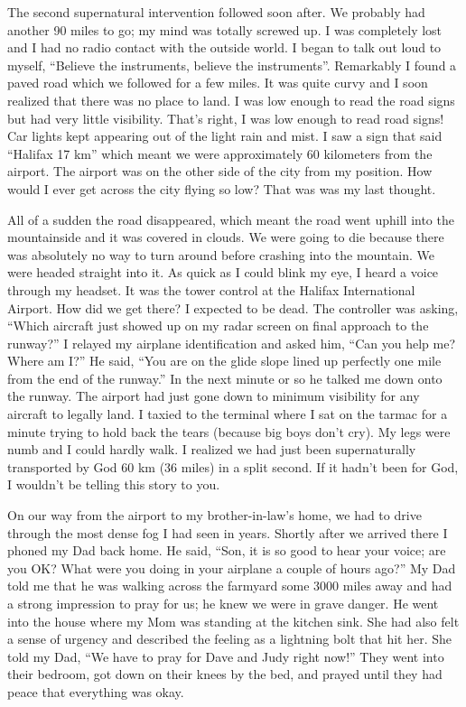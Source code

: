 \documentclass[oneside]{book}
\begin{document}
The second supernatural intervention followed soon after. We probably had another 90 miles to go; my mind was totally screwed up. I was completely lost and I had no radio contact with the outside world. I began to talk out loud to myself, “Believe the instruments, believe the instruments”. Remarkably I found a paved road which we followed for a few miles. It was quite curvy and I soon realized that there was no place to land. I was low enough to read the road signs but had very little visibility. That’s right, I was low enough to read road signs! Car lights kept appearing out of the light rain and mist. I saw a sign that said “Halifax 17 km” which meant we were approximately 60 kilometers from the airport. The airport was on the other side of the city from my position. How would I ever get across the city flying so low? That was was my last thought. 

All of a sudden the road disappeared, which meant the road went uphill into the mountainside and it was covered in clouds. We were going to die because there was absolutely no way to turn around before crashing into the mountain. We were headed straight into it. As quick as I could blink my eye, I heard a voice through my headset. It was the tower control at the Halifax International Airport. How did we get there? I expected to be dead. The controller was asking, “Which aircraft just showed up on my radar screen on final approach to the runway?” I relayed my airplane identification and asked him, “Can you help me? Where am I?” He said, “You are on the glide slope lined up perfectly one mile from the end of the runway.” In the next minute or so he talked me down onto the runway. The airport had just gone down to minimum visibility for any aircraft to legally land. I taxied to the terminal where I sat on the tarmac for a minute trying to hold back the tears (because big boys don't cry). My legs were numb and I could hardly walk. I realized we had just been supernaturally transported by God 60 km (36 miles) in a split second. If it hadn’t been for God, I wouldn't be telling this story to you.

On our way from the airport to my brother-in-law's home, we had to drive through the most dense fog I had seen in years. Shortly after we arrived there I phoned my Dad back home. He said, “Son, it is so good to hear your voice; are you OK? What were you doing in your airplane a couple of hours ago?” My Dad told me that he was walking across the farmyard some 3000 miles away and had a strong impression to pray for us; he knew we were in grave danger. He went into the house where my Mom was standing at the kitchen sink. She had also felt a sense of urgency and described the feeling as a lightning bolt that hit her. She told my Dad, “We have to pray for Dave and Judy right now!” They went into their bedroom, got down on their knees by the bed, and prayed until they had peace that everything was okay.
\end{document}
